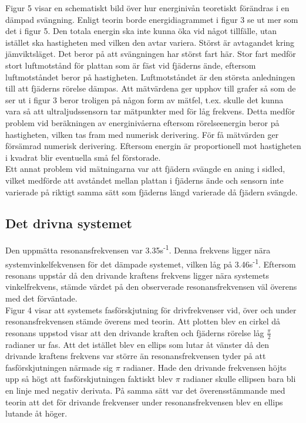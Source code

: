 \documentclass[a4paper,10pt]{article}
\begin{document}
Figur 5 visar en schematiskt bild över hur energinivån teoretiskt förändras i en dämpad svängning. Enligt teorin borde energidiagrammet i figur 3 se ut mer som det i figur 5. Den totala energin ska inte kunna öka vid något tillfälle, utan istället ska hastigheten med vilken den avtar variera. Störst är avtagandet kring jämviktsläget. Det beror på att svängningen har störst fart här. Stor fart medför stort luftmotstånd för plattan som är fäst vid fjäderns ände, eftersom luftmotståndet beror på hastigheten. Luftmotståndet är den största anledningen till att fjäderns rörelse dämpas. Att mätvärdena ger upphov till grafer så som de ser ut i figur 3 beror troligen på någon form av mätfel, t.ex. skulle det kunna vara så att ultraljudssensorn tar mätpunkter med för låg frekvens. Detta medför problem vid beräkningen av energinivåerna eftersom rörelseenergin beror på hastigheten, vilken tas fram med numerisk derivering. För få mätvärden ger försämrad numerisk derivering. Eftersom energin är proportionell mot hastigheten i kvadrat blir eventuella små fel förstorade.\\
\indent Ett annat problem vid mätningarna var att fjädern svängde en aning i sidled, vilket medförde att avståndet mellan plattan i fjäderns ände och sensorn inte varierade på riktigt samma sätt som fjäderns längd varierade då fjädern svängde.

\subsection{Det drivna systemet}
Den uppmätta resonansfrekvensen var 3.35s\textsuperscript{-1}. Denna frekvens ligger nära systemvinkelfekvensen för det dämpade systemet, vilken låg på 3.46s\textsuperscript{-1}. Eftersom resonans uppstår då den drivande kraftens frekvens ligger nära systemets vinkelfrekvens, stämde värdet på den observerade resonansfrekvensen väl överens med det förväntade.\\
\indent Figur 4 visar att systemets fasförskjutning för drivfrekvenser vid, över och under resonansfrekvensen stämde överens med teorin. Att plotten blev en cirkel då resonans uppstod visar att den drivande kraften och fjäderns rörelse låg $\frac{\pi}{2}$ radianer ur fas. Att det istället blev en ellips som lutar åt vänster då den drivande kraftens frekvens var större än resonansfrekvensen tyder på att fasförskjutningen närmade sig $\pi$ radianer. Hade den drivande frekvensen höjts upp så högt att fasförskjutningen faktiskt blev $\pi$ radianer skulle ellipsen bara bli en linje med negativ derivata. På samma sätt var det överensstämmande med teorin att det för drivande frekvenser under resonansfrekvensen blev en ellips lutande åt höger.
\end{document}
